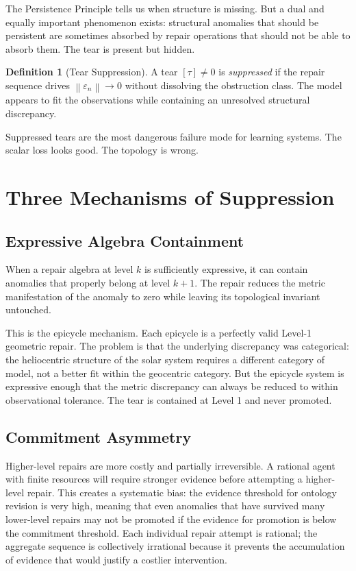 \documentclass[12pt,oneside]{book}
\theoremstyle{plain}
\theoremstyle{definition}
\newtheorem{definition}[theorem]{Definition}
\theoremstyle{remark}
\newcommand{\eps}{\varepsilon}
\newcommand{\norm}[1]{\left\lVert #1 \right\rVert}
\newcommand{\1}{\mathbf{1}}
\begin{document}
The Persistence Principle tells us when structure is missing. But a dual and equally important phenomenon exists: structural anomalies that should be persistent are sometimes absorbed by repair operations that should not be able to absorb them. The tear is present but hidden.

\begin{definition}[Tear Suppression]
A tear $[\tau] \neq 0$ is \emph{suppressed} if the repair sequence drives $\norm{\eps_n} \to 0$ without dissolving the obstruction class. The model appears to fit the observations while containing an unresolved structural discrepancy.
\end{definition}

Suppressed tears are the most dangerous failure mode for learning systems. The scalar loss looks good. The topology is wrong.

\section{Three Mechanisms of Suppression}

\subsection{Expressive Algebra Containment}

When a repair algebra at level $k$ is sufficiently expressive, it can contain anomalies that properly belong at level $k+1$. The repair reduces the metric manifestation of the anomaly to zero while leaving its topological invariant untouched.

This is the epicycle mechanism. Each epicycle is a perfectly valid Level-1 geometric repair. The problem is that the underlying discrepancy was categorical: the heliocentric structure of the solar system requires a different category of model, not a better fit within the geocentric category. But the epicycle system is expressive enough that the metric discrepancy can always be reduced to within observational tolerance. The tear is contained at Level 1 and never promoted.

\subsection{Commitment Asymmetry}

Higher-level repairs are more costly and partially irreversible. A rational agent with finite resources will require stronger evidence before attempting a higher-level repair. This creates a systematic bias: the evidence threshold for ontology revision is very high, meaning that even anomalies that have survived many lower-level repairs may not be promoted if the evidence for promotion is below the commitment threshold. Each individual repair attempt is rational; the aggregate sequence is collectively irrational because it prevents the accumulation of evidence that would justify a costlier intervention.
\end{document}
